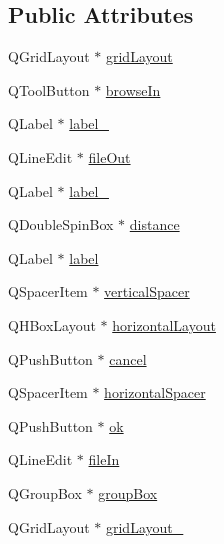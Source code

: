 \subsection*{Public Attributes}
\begin{DoxyCompactItemize}
\item 
Q\+Grid\+Layout $\ast$ \mbox{\hyperlink{class_ui___merge_data_dialog_ad417562a6f7d3dfc7a77b10d4d0e0170}{grid\+Layout}}
\item 
Q\+Tool\+Button $\ast$ \mbox{\hyperlink{class_ui___merge_data_dialog_a7618494ca960071d50acbbb193ee2f8e}{browse\+In}}
\item 
Q\+Label $\ast$ \mbox{\hyperlink{class_ui___merge_data_dialog_a8e903dc7db05594823b8923254e25923}{label\+\_}}
\item 
Q\+Line\+Edit $\ast$ \mbox{\hyperlink{class_ui___merge_data_dialog_a59923b27de3217cc49dafef9eff76f3d}{file\+Out}}
\item 
Q\+Label $\ast$ \mbox{\hyperlink{class_ui___merge_data_dialog_acc633e8579e283a5f59693917bb87199}{label\+\_}}
\item 
Q\+Double\+Spin\+Box $\ast$ \mbox{\hyperlink{class_ui___merge_data_dialog_ad21bc5b56e532f18e462c8b35d66cf3f}{distance}}
\item 
Q\+Label $\ast$ \mbox{\hyperlink{class_ui___merge_data_dialog_a7970abf2622e1123e6313080690a2de7}{label}}
\item 
Q\+Spacer\+Item $\ast$ \mbox{\hyperlink{class_ui___merge_data_dialog_aa13e2b98b03564a23d6f7799e0533037}{vertical\+Spacer}}
\item 
Q\+H\+Box\+Layout $\ast$ \mbox{\hyperlink{class_ui___merge_data_dialog_a7057fd40686cf98fa20528e14d50f5e1}{horizontal\+Layout}}
\item 
Q\+Push\+Button $\ast$ \mbox{\hyperlink{class_ui___merge_data_dialog_afddca61e3f4b89e9d869c366f82a72f6}{cancel}}
\item 
Q\+Spacer\+Item $\ast$ \mbox{\hyperlink{class_ui___merge_data_dialog_afffcf4a5a37a803fcb84216b526c3ebd}{horizontal\+Spacer}}
\item 
Q\+Push\+Button $\ast$ \mbox{\hyperlink{class_ui___merge_data_dialog_a35542821c9d9ce4ca8cf9ecc7180ef2a}{ok}}
\item 
Q\+Line\+Edit $\ast$ \mbox{\hyperlink{class_ui___merge_data_dialog_a5d3370dbd7e48b47aa6630ec2da6fa39}{file\+In}}
\item 
Q\+Group\+Box $\ast$ \mbox{\hyperlink{class_ui___merge_data_dialog_a55829924e7bfd59ffffbc32d53334ded}{group\+Box}}
\item 
Q\+Grid\+Layout $\ast$ \mbox{\hyperlink{class_ui___merge_data_dialog_a4451563004e32086023a0dae89dec8fb}{grid\+Layout\+\_}}

\end{DoxyCompactItemize}
